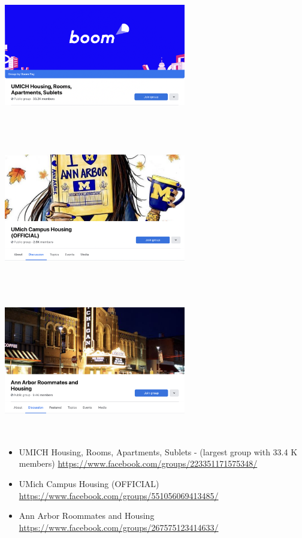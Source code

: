 \documentclass[
]{book}
\providecommand{\tightlist}{%
  \setlength{\itemsep}{0pt}\setlength{\parskip}{0pt}}
\begin{document}
\includegraphics[width=3.125in,height=2.60417in]{Screen Shot 2022-08-03 at 3.05.44 PM.png}
\includegraphics[width=3.125in,height=2.60417in]{Screen Shot 2022-08-03 at 3.05.55 PM.png}
\includegraphics[width=3.125in,height=2.60417in]{Screen Shot 2022-08-03 at 3.06.08 PM.png}

\begin{itemize}
\tightlist
\item
  UMICH Housing, Rooms, Apartments, Sublets - (largest group with 33.4 K members)
  \url{https://www.facebook.com/groups/223351171575348/}
\item
  UMich Campus Housing (OFFICIAL)
  \url{https://www.facebook.com/groups/551056069413485/}
\item
  Ann Arbor Roommates and Housing
  \url{https://www.facebook.com/groups/267575123414633/}
\end{itemize}
\end{document}
